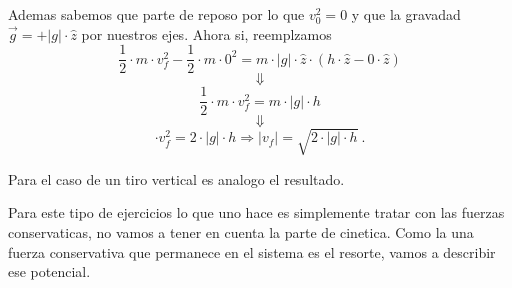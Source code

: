 \documentclass[../Main.tex]{subfiles}
\begin{document}
{Ademas sabemos que parte de reposo por lo que $v_0^2 = 0$ y que la gravadad 
$\vec{g} = +|g| \cdot \hat{z}$ por nuestros ejes. Ahora si, reemplzamos
\begin{equation*}
    \frac{1}{2} \cdot m \cdot v_f^2 - \frac{1}{2} \cdot m \cdot 0^2 = m \cdot |g| \cdot \hat{z} \cdot \left( h \cdot \hat{z} - 0 \cdot \hat{z} \right)
\end{equation*}
\begin{equation*}
    \Downarrow
\end{equation*}
\begin{equation*}
    \frac{1}{2} \cdot m \cdot v_f^2 = m \cdot |g| \cdot h
\end{equation*}
\begin{equation*}
    \Downarrow
\end{equation*}
\begin{equation*}
    \cdot v_f^2 = 2 \cdot |g| \cdot h \Rightarrow |v_f| = \sqrt{2 \cdot |g| \cdot h} \ .
\end{equation*}

Para el caso de un tiro vertical es analogo el resultado.


Para este tipo de ejercicios lo que uno hace es simplemente tratar con las 
fuerzas conservaticas, no vamos a tener en cuenta la parte de cinetica. Como la
una fuerza conservativa que permanece en el sistema es el resorte, vamos a
describir ese potencial.

}
\end{document}
